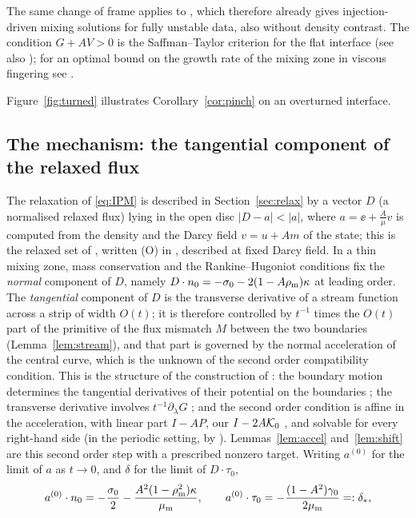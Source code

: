 The same change of frame applies to \cite[Thm.~1.1]{LM26}, which therefore already gives injection-driven mixing solutions for fully unstable data, also without density contrast. The condition
$G+AV>0$ is the Saffman--Taylor criterion for the flat interface \cite{ST58} (see also \cite{Hom87}); for an optimal bound on the growth rate of the mixing zone in viscous fingering see \cite{Ott97}.

Figure~\ref{fig:turned} illustrates Corollary~\ref{cor:pinch} on an overturned interface.

\subsection{The mechanism: the tangential component of the relaxed flux}\label{x:mechanism}
The relaxation of \eqref{eq:IPM} is described in Section~\ref{sec:relax} by a vector $D$ (a normalised relaxed flux) lying in the open disc $|D-a|<|a|$, where $a=\ee+\frac{A}{\mu}v$ is computed from the
density and the Darcy field $v=u+Am$ of the state; this is the relaxed set of \cite{Men22}, written (O) in \cite{LM26}, described at fixed Darcy field. In a thin mixing zone, mass conservation and
the Rankine--Hugoniot conditions fix the \emph{normal} component of $D$, namely $D\cdot n_0=-\sigma_0-2(1-A\rho_{\mathrm m})\kappa$ at leading order. The \emph{tangential} component of $D$ is the transverse
derivative of a stream function across a strip of width $O(t)$; it is therefore controlled by $t^{-1}$ times the $O(t)$ part of the primitive of the flux mismatch $M$ between the two boundaries
(Lemma~\ref{lem:stream}), and that part is governed by the normal acceleration of the central curve, which is the unknown of the second order compatibility condition. This is the structure of the
construction of \cite{LM26}: the boundary motion determines the tangential derivatives of their potential on the boundaries \cite[Sec.~3.3.1 and (4.12)]{LM26}; the transverse derivative involves
$t^{-1}\partial_\lambda G$ \cite[Sec.~3.3.4]{LM26}; and the second order condition is affine in the acceleration, with linear part $I-AP$, our $I-2A\mathcal{K}_0$ \cite[Lemma~5.3, (5.21) and (8.41)]{LM26},
and solvable for every right-hand side \cite[Prop.~6.1]{LM26} (in the periodic setting, by \cite{CCG11}). Lemmas~\ref{lem:accel} and~\ref{lem:shift} are this second order step with a prescribed
nonzero target. Writing $a^{(0)}$ for the limit of $a$ as $t\to0$, and $\delta$ for the limit of $D\cdot\tau_0$,
\[
a^{(0)}\cdot n_0=-\frac{\sigma_0}2-\frac{A^2(1-\rho_{\mathrm m}^2)\kappa}{\mu_{\mathrm m}},\qquad a^{(0)}\cdot\tau_0=-\frac{(1-A^2)\gamma_0}{2\mu_{\mathrm m}}=:\delta_*,
\]
